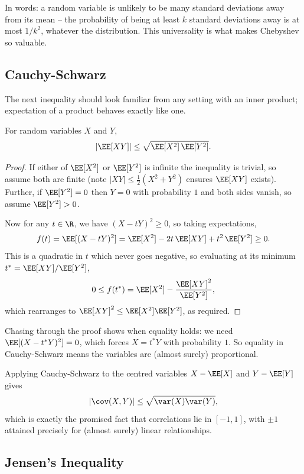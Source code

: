 In words: a random variable is unlikely to be many standard deviations away from its mean -- the probability of being at least $k$ standard deviations away is at most $1/k^2$, whatever the distribution. This universality is what makes Chebyshev so valuable.

\subsection{Cauchy-Schwarz}

The next inequality should look familiar from any setting with an inner product; expectation of a product behaves exactly like one.

\begin{theorem}
	For random variables $X$ and $Y$,
	$$
	\left|\EE[XY]\right| \leq \sqrt{\EE[X^2]\,\EE[Y^2]}.
	$$
\end{theorem}
\begin{proof}
	If either of $\EE[X^2]$ or $\EE[Y^2]$ is infinite the inequality is trivial, so assume both are finite (note $|XY| \leq \frac{1}{2}(X^2 + Y^2)$ ensures $\EE[XY]$ exists). Further, if $\EE[Y^2] = 0$ then $Y = 0$ with probability $1$ and both sides vanish, so assume $\EE[Y^2] > 0$.

	Now for any $t \in \R$, we have $(X - tY)^2 \geq 0$, so taking expectations,
	$$
	f(t) = \EE[(X - tY)^2] = \EE[X^2] - 2t\,\EE[XY] + t^2\,\EE[Y^2] \geq 0.
	$$
	This is a quadratic in $t$ which never goes negative, so evaluating at its minimum $t^* = \EE[XY]/\EE[Y^2]$,
	$$
	0 \leq f(t^*) = \EE[X^2] - \frac{\EE[XY]^2}{\EE[Y^2]},
	$$
	which rearranges to $\EE[XY]^2 \leq \EE[X^2]\EE[Y^2]$, as required.
\end{proof}

\begin{remark}
	Chasing through the proof shows when equality holds: we need $\EE[(X - t^* Y)^2] = 0$, which forces $X = t^* Y$ with probability $1$. So equality in Cauchy-Schwarz means the variables are (almost surely) proportional.
\end{remark}

Applying Cauchy-Schwarz to the centred variables $X - \EE[X]$ and $Y - \EE[Y]$ gives
$$
|\cov(X, Y)| \leq \sqrt{\var(X)\var(Y)},
$$
which is exactly the promised fact that correlations lie in $[-1, 1]$, with $\pm 1$ attained precisely for (almost surely) linear relationships.

\subsection{Jensen's Inequality}


